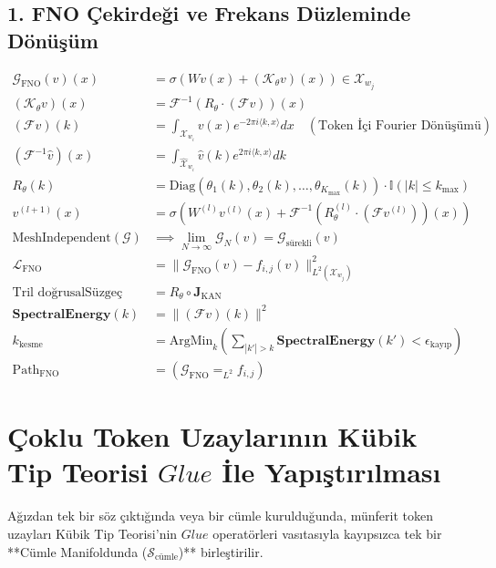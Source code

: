 \documentclass[11pt, a4paper]{article}
\begin{document}
\subsection{1. FNO Çekirdeği ve Frekans Düzleminde Dönüşüm}
\begin{align}
\mathcal{G}_{\text{FNO}}(v)(x) &= \sigma\left( W v(x) + (\mathcal{K}_\theta v)(x) \right) \in \mathcal{X}_{w_j} \\
(\mathcal{K}_\theta v)(x) &= \mathcal{F}^{-1} \left( R_\theta \cdot (\mathcal{F} v) \right)(x) \\
(\mathcal{F} v)(k) &= \int_{\mathcal{X}_{w_i}} v(x) e^{-2\pi i \langle k, x \rangle} dx \quad (\text{Token İçi Fourier Dönüşümü}) \\
(\mathcal{F}^{-1} \hat{v})(x) &= \int_{\hat{\mathcal{X}}_{w_i}} \hat{v}(k) e^{2\pi i \langle k, x \rangle} dk \\
R_\theta(k) &= \text{Diag}(\theta_1(k), \theta_2(k), \dots, \theta_{K_{\max}}(k)) \cdot \mathbb{I}(|k| \le k_{\text{max}}) \\
v^{(l+1)}(x) &= \sigma\left( W^{(l)} v^{(l)}(x) + \mathcal{F}^{-1} \left( R_\theta^{(l)} \cdot (\mathcal{F} v^{(l)}) \right)(x) \right) \\
\text{MeshIndependent}(\mathcal{G}) &\implies \lim_{N \to \infty} \mathcal{G}_N(v) = \mathcal{G}_{\text{sürekli}}(v) \\
\mathcal{L}_{\text{FNO}} &= \| \mathcal{G}_{\text{FNO}}(v) - f_{i,j}(v) \|_{L^2(\mathcal{X}_{w_j})}^2 \\
\text{Tril doğrusalSüzgeç} &= R_\theta \circ \mathbf{J}_{\text{KAN}} \\
\mathbf{SpectralEnergy}(k) &= \| (\mathcal{F} v)(k) \|^2 \\
k_{\text{kesme}} &= \text{ArgMin}_k \left( \sum_{|k'|>k} \mathbf{SpectralEnergy}(k') < \epsilon_{\text{kayıp}} \right) \\
\text{Path}_{\text{FNO}} &= (\mathcal{G}_{\text{FNO}} =_{L^2} f_{i,j})
\end{align}

\section{Çoklu Token Uzaylarının Kübik Tip Teorisi $Glue$ İle Yapıştırılması}

Ağızdan tek bir söz çıktığında veya bir cümle kurulduğunda, münferit token uzayları Kübik Tip Teorisi'nin $Glue$ operatörleri vasıtasıyla kayıpsızca tek bir **Cümle Manifoldunda ($\mathcal{S}_{\text{cümle}}$)** birleştirilir.
\end{document}
